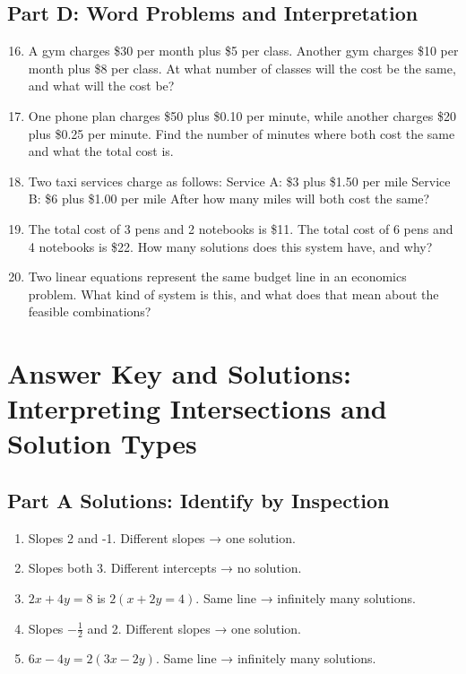 \documentclass[14pt]{extarticle}
\begin{document}
\subsection*{Part D: Word Problems and Interpretation}
\begin{enumerate}
    \setcounter{enumi}{15}
    \item A gym charges \$30 per month plus \$5 per class. Another gym charges \$10 per month plus \$8 per class. At what number of classes will the cost be the same, and what will the cost be?
    \item One phone plan charges \$50 plus \$0.10 per minute, while another charges \$20 plus \$0.25 per minute. Find the number of minutes where both cost the same and what the total cost is.
    \item Two taxi services charge as follows:  
    Service A: \$3 plus \$1.50 per mile  
    Service B: \$6 plus \$1.00 per mile  
    After how many miles will both cost the same?
    \item The total cost of 3 pens and 2 notebooks is \$11. The total cost of 6 pens and 4 notebooks is \$22. How many solutions does this system have, and why?
    \item Two linear equations represent the same budget line in an economics problem. What kind of system is this, and what does that mean about the feasible combinations?
\end{enumerate}


\section*{Answer Key and Solutions: Interpreting Intersections and Solution Types}

\subsection*{Part A Solutions: Identify by Inspection}
\begin{enumerate}
  \item Slopes 2 and -1. Different slopes → one solution.
  \item Slopes both 3. Different intercepts → no solution.
  \item \(2x+4y=8\) is \(2(x+2y=4)\). Same line → infinitely many solutions.
  \item Slopes \(-\tfrac12\) and 2. Different slopes → one solution.
  \item \(6x-4y=2(3x-2y)\). Same line → infinitely many solutions.
\end{enumerate}
\end{document}
